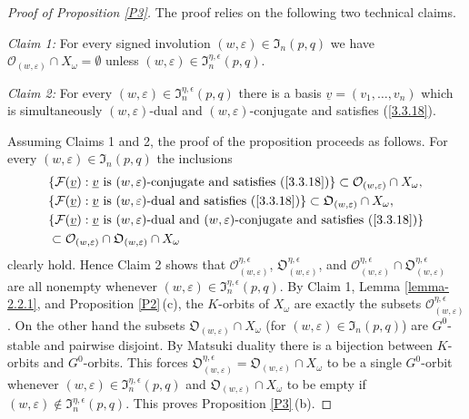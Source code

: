 \documentclass{amsart}
\theoremstyle{definition}
\begin{document}
\begin{proof}[Proof of Proposition \ref{P3}]
The proof relies on the following two technical claims.

\medskip
\item
{\it Claim 1:}
For every signed involution $(w,\varepsilon)\in\mathfrak{I}_n(p,q)$ we have
$\mathcal{O}_{(w,\varepsilon)}\cap X_\omega=\emptyset$ unless $(w,\varepsilon)\in\mathfrak{I}_n^{\eta,\epsilon}(p,q)$.

\medskip
\noindent
{\it Claim 2:}
For every $(w,\varepsilon)\in\mathfrak{I}_n^{\eta,\epsilon}(p,q)$ there is a basis $\underline{v}=(v_1,\ldots,v_n)$ which is simultaneously $(w,\varepsilon)$-dual and $(w,\varepsilon)$-conjugate and satisfies (\ref{3.3.18}).

\medskip

Assuming Claims 1 and 2, the proof of the proposition proceeds as follows. For every $(w,\varepsilon)\in\mathfrak{I}_n(p,q)$ the inclusions
\begin{eqnarray}
\label{proof.P3.1} & \{\mathcal{F}(\underline{v}):\mbox{$\underline{v}$ is $(w,\varepsilon)$-conjugate
 and satisfies (\ref{3.3.18})}\}\subset\mathcal{O}_{(w,\varepsilon)}\cap X_\omega,
 \\
\label{proof.P3.2} & \{\mathcal{F}(\underline{v}):\mbox{$\underline{v}$ is $(w,\varepsilon)$-dual
 and satisfies (\ref{3.3.18})}\}\subset\mathfrak{O}_{(w,\varepsilon)}\cap X_\omega, \\
\label{proof.P3.3} & \{\mathcal{F}(\underline{v}):\mbox{$\underline{v}$ is $(w,\varepsilon)$-dual and $(w,\varepsilon)$-conjugate and satisfies (\ref{3.3.18})}\}\\ \nonumber
& \subset
\mathcal{O}_{(w,\varepsilon)}\cap\mathfrak{O}_{(w,\varepsilon)}\cap X_\omega
\end{eqnarray}
clearly hold. Hence Claim 2 shows that 
$\mathcal{O}_{(w,\varepsilon)}^{\eta,\epsilon}$, $\mathfrak{O}_{(w,\varepsilon)}^{\eta,\epsilon}$, and
$\mathcal{O}_{(w,\varepsilon)}^{\eta,\epsilon}\cap\mathfrak{O}_{(w,\varepsilon)}^{\eta,\epsilon}$ are all nonempty whenever $(w,\varepsilon)\in\mathfrak{I}_n^{\eta,\epsilon}(p,q)$.
By Claim 1, Lemma \ref{lemma-2.2.1}, and Proposition \ref{P2}\,{\rm (c)}, the $K$-orbits of $X_\omega$ are exactly the subsets $\mathcal{O}_{(w,\varepsilon)}^{\eta,\epsilon}$.
On the other hand the subsets $\mathfrak{O}_{(w,\varepsilon)}\cap X_\omega$ (for $(w,\varepsilon)\in\mathfrak{I}_n(p,q)$) are $G^0$-stable and pairwise disjoint. By Matsuki duality there is a bijection between $K$-orbits and $G^0$-orbits. This forces $\mathfrak{O}_{(w,\varepsilon)}^{\eta,\epsilon}=\mathfrak{O}_{(w,\varepsilon)}\cap X_\omega$ to be a single $G^0$-orbit whenever $(w,\varepsilon)\in\mathfrak{I}_n^{\eta,\epsilon}(p,q)$ and  $\mathfrak{O}_{(w,\varepsilon)}\cap X_\omega$ to be empty if $(w,\varepsilon)\notin\mathfrak{I}_n^{\eta,\epsilon}(p,q)$.
This proves Proposition \ref{P3}\,{\rm (b)}.


\end{proof}
\end{document}
